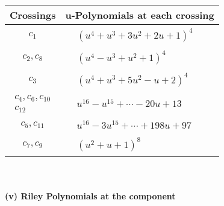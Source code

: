 \documentclass[1p]{elsarticle_modified}
\theoremstyle{definition}
\begin{document}
\begin{tabular}{m{50pt}|m{274pt}}
Crossings & \hspace{64pt}u-Polynomials at each crossing \\
\hline $$\begin{aligned}c_{1}\end{aligned}$$&$\begin{aligned}
&(u^4+u^3+3 u^2+2 u+1)^4
\end{aligned}$\\
\hline $$\begin{aligned}c_{2},c_{8}\end{aligned}$$&$\begin{aligned}
&(u^4- u^3+u^2+1)^4
\end{aligned}$\\
\hline $$\begin{aligned}c_{3}\end{aligned}$$&$\begin{aligned}
&(u^4+u^3+5 u^2- u+2)^4
\end{aligned}$\\
\hline $$\begin{aligned}c_{4},c_{6},c_{10}\\c_{12}\end{aligned}$$&$\begin{aligned}
&u^{16}- u^{15}+\cdots-20 u+13
\end{aligned}$\\
\hline $$\begin{aligned}c_{5},c_{11}\end{aligned}$$&$\begin{aligned}
&u^{16}-3 u^{15}+\cdots+198 u+97
\end{aligned}$\\
\hline $$\begin{aligned}c_{7},c_{9}\end{aligned}$$&$\begin{aligned}
&(u^2+u+1)^8
\end{aligned}$\\
\hline
\end{tabular}\\~\\
\newpage\renewcommand{\arraystretch}{1}
\flushleft \textbf{(v) Riley Polynomials at the component}\newline \\
\end{document}
